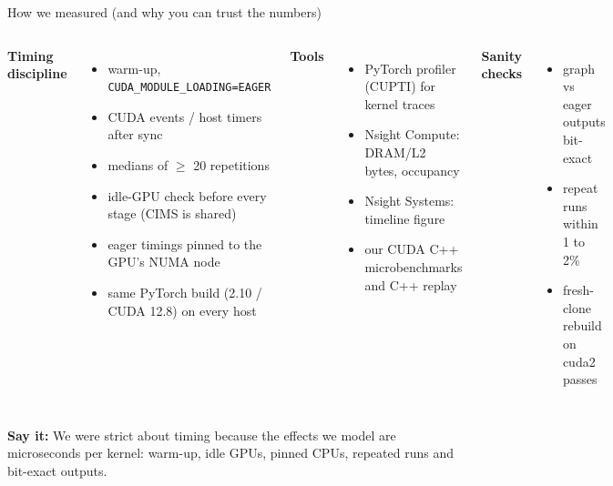 \documentclass[aspectratio=169,10pt]{beamer}
\newcommand{\say}[1]{\par\vfill\noindent\colorbox{soft}{\parbox{\dimexpr\textwidth-2\fboxsep\relax}{\small\textbf{\textcolor{accent}{Say it:}} #1}}}
\begin{document}
\begin{frame}{How we measured (and why you can trust the numbers)}
\begin{columns}[T]
\textbf{Timing discipline}
\begin{itemize}\small
\item warm-up, \texttt{CUDA\_MODULE\_LOADING=EAGER}
\item CUDA events / host timers after sync
\item medians of $\geq$ 20 repetitions
\item idle-GPU check before every stage (CIMS is shared)
\item eager timings pinned to the GPU's NUMA node
\item same PyTorch build (2.10 / CUDA 12.8) on every host
\end{itemize}
\textbf{Tools}
\begin{itemize}\small
\item PyTorch profiler (CUPTI) for kernel traces
\item Nsight Compute: DRAM/L2 bytes, occupancy
\item Nsight Systems: timeline figure
\item our CUDA C++ microbenchmarks and C++ replay
\end{itemize}
\textbf{Sanity checks}
\begin{itemize}\small
\item graph vs eager outputs bit-exact
\item repeat runs within 1 to 2\%
\item fresh-clone rebuild on cuda2 passes
\end{itemize}
\end{columns}
\say{We were strict about timing because the effects we model are microseconds per kernel:
warm-up, idle GPUs, pinned CPUs, repeated runs and bit-exact outputs.}
\end{frame}
\end{document}
